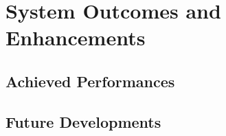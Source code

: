 \section{System Outcomes and Enhancements}

\subsection{Achieved Performances}

\subsection{Future Developments}
